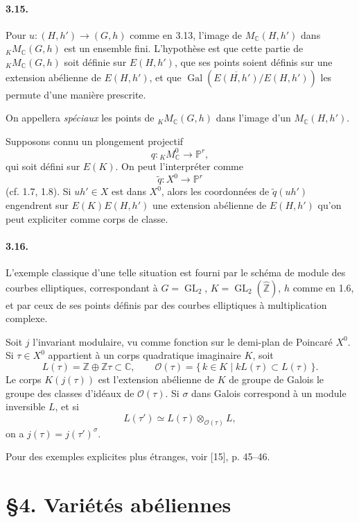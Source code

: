 \documentclass[10pt]{article}
\newcommand{\C}{\mathbb C}
\newcommand{\Z}{\mathbb Z}
\newcommand{\GL}{\operatorname{GL}}
\newcommand{\Gal}{\operatorname{Gal}}
\begin{document}
\paragraph{3.15.} Pour $u:(H,h')\longrightarrow(G,h)$ comme en 3.13, l'image de $M_{\C}(H,h')$ dans ${}_K M_{\C}(G,h)$ est un ensemble fini. L'hypothèse est que cette partie de ${}_K M_{\C}(G,h)$ soit définie sur $E(H,h')$, que ses points soient définis sur une extension abélienne de $E(H,h')$, et que $\Gal(\overline{E(H,h')}/E(H,h'))$ les permute d'une manière prescrite.

On appellera \emph{spéciaux} les points de ${}_K M_{\C}(G,h)$ dans l'image d'un $M_{\C}(H,h')$.

Supposons connu un plongement projectif
\[
q:{}_K M_{\C}^{0}\longrightarrow \mathbb P^r,
\]
qui soit défini sur $E(K)$. On peut l'interpréter comme
\[
\widetilde q:X^0\longrightarrow \mathbb P^r
\]
(cf. 1.7, 1.8). Si $uh'\in X$ est dans $X^0$, alors les coordonnées de $\widetilde q(uh')$ engendrent sur $E(K)E(H,h')$ une extension abélienne de $E(H,h')$ qu'on peut expliciter comme corps de classe.

\paragraph{3.16.} L'exemple classique d'une telle situation est fourni par le schéma de module des courbes elliptiques, correspondant à $G=\GL_2$, $K=\GL_2(\widehat{\Z})$, $h$ comme en 1.6, et par ceux de ses points définis par des courbes elliptiques à multiplication complexe.

Soit $j$ l'invariant modulaire, vu comme fonction sur le demi-plan de Poincaré $X^0$. Si $\tau\in X^0$ appartient à un corps quadratique imaginaire $K$, soit
\[
L(\tau)=\Z\oplus \Z\tau\subset\C,
\qquad
\mathcal O(\tau)=\{\,k\in K\mid kL(\tau)\subset L(\tau)\,\}.
\]
Le corps $K(j(\tau))$ est l'extension abélienne de $K$ de groupe de Galois le groupe des classes d'idéaux de $\mathcal O(\tau)$. Si $\sigma$ dans Galois correspond à un module inversible $L$, et si
\[
L(\tau')\simeq L(\tau)\otimes_{\mathcal O(\tau)}L,
\]
on a $j(\tau)=j(\tau')^\sigma$.

Pour des exemples explicites plus étranges, voir [15], p. 45--46.

\section*{\S 4. Variétés abéliennes}
\end{document}
